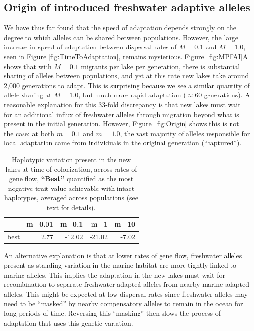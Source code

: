 \documentclass{article}
\begin{document}
\subsection*{Origin of introduced freshwater adaptive alleles}

We have thus far found that the speed of adaptation depends strongly on the degree to which alleles can be shared between populations. However, the large increase in speed of adaptation between dispersal rates of $M = 0.1$ and $M = 1.0$, seen in Figure \ref{fig:TimeToAdaptation}, remains mysterious. Figure~\ref{fig:MPFAI}A shows that with $M = 0.1$ migrants per lake per generation, there is substantial sharing of alleles between populations, and yet at this rate new lakes take around 2,000 generations to adapt. This is surprising because we see a similar quantity of allele sharing at  $M = 1.0$, but much more rapid adaptation ($\approx 60$ generations). A reasonable explanation for this 33-fold discrepancy is that new lakes must wait for an additional influx of freshwater alleles through migration beyond what is present in the initial generation. However, Figure~\ref{fig:Origin} shows this is not the case: at both $m = 0.1$ and $m = 1.0$, the vast majority of alleles responsible for local adaptation came from individuals in the original generation (``captured'').

\begin{table}[ht]
    \centering
    \begin{tabular}{rrrrr}
      \hline
     & m=0.01 & m=0.1 & m=1 & m=10 \\ 
      \hline
          best & 2.77 & -12.02 & -21.02 & -7.02 \\ 
       \hline
    \end{tabular}
    \caption{
        Haplotypic variation present in the new lakes at time of colonization,
        across rates of gene flow,
        \textbf{``Best''} 
        quantified as the most negative trait value achievable
        with intact haplotypes, averaged across populations
        (see text for details).
    } \label{tab:linkage}
\end{table}

An alternative explanation is that at lower rates of gene flow, freshwater alleles present as standing variation in the marine habitat are more tightly linked to marine alleles. This implies the adaptation in the new lakes must wait for recombination to separate freshwater adapted alleles from nearby marine adapted alleles. This might be expected at low dispersal rates since freshwater alleles may need to be ``masked'' by nearby compensatory alleles to remain in the ocean for long periods of time. Reversing this ``masking'' then slows the process of adaptation that uses this genetic variation.
\end{document}
